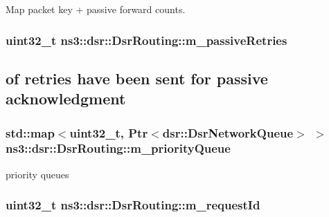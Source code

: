 Map packet key + passive forward counts. 

\subsubsection[{\texorpdfstring{m\+\_\+passive\+Retries}{m_passiveRetries}}]{\setlength{\rightskip}{0pt plus 5cm}uint32\+\_\+t ns3\+::dsr\+::\+Dsr\+Routing\+::m\+\_\+passive\+Retries\hspace{0.3cm}{\ttfamily [private]}}\hypertarget{classns3_1_1dsr_1_1DsrRouting_a88b8d65dce20b6b8f910be916623da0b}{}\label{classns3_1_1dsr_1_1DsrRouting_a88b8d65dce20b6b8f910be916623da0b}


\subsection*{of retries have been sent for passive acknowledgment}

\subsubsection[{\texorpdfstring{m\+\_\+priority\+Queue}{m_priorityQueue}}]{\setlength{\rightskip}{0pt plus 5cm}std\+::map$<$uint32\+\_\+t, {\bf Ptr}$<${\bf dsr\+::\+Dsr\+Network\+Queue}$>$ $>$ ns3\+::dsr\+::\+Dsr\+Routing\+::m\+\_\+priority\+Queue\hspace{0.3cm}{\ttfamily [private]}}\hypertarget{classns3_1_1dsr_1_1DsrRouting_a4606c3dfb1099afbfe1e7cd1d1c3c8ee}{}\label{classns3_1_1dsr_1_1DsrRouting_a4606c3dfb1099afbfe1e7cd1d1c3c8ee}


priority queues 

\subsubsection[{\texorpdfstring{m\+\_\+request\+Id}{m_requestId}}]{\setlength{\rightskip}{0pt plus 5cm}uint32\+\_\+t ns3\+::dsr\+::\+Dsr\+Routing\+::m\+\_\+request\+Id\hspace{0.3cm}{\ttfamily [private]}}\hypertarget{classns3_1_1dsr_1_1DsrRouting_a4d9ddfed8e907a5885bb5e0f4b41f388}{}\label{classns3_1_1dsr_1_1DsrRouting_a4d9ddfed8e907a5885bb5e0f4b41f388}


